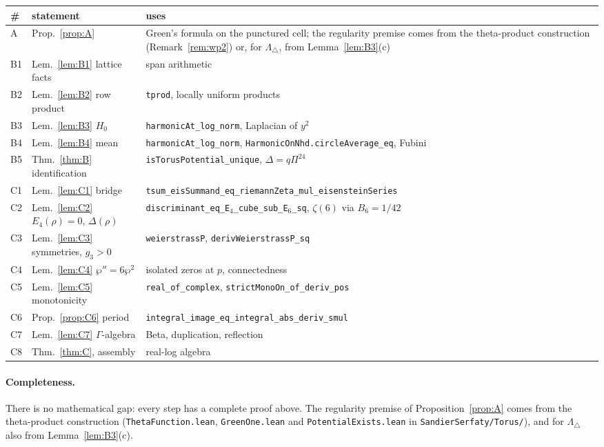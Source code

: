 \documentclass[11pt]{article}
\theoremstyle{definition}
\theoremstyle{remark}
\newcommand{\Ltri}{\Lambda_{\triangle}}
\newcommand{\lean}[1]{\texttt{#1}}
\begin{document}
\begin{center}
\begin{tabular}{@{}lp{4.3cm}p{8.6cm}@{}}
\toprule
\# & statement & uses\\
\midrule
A & Prop.~\ref{prop:A} & Green's formula on the punctured cell; the regularity premise comes from the theta-product
construction (Remark~\ref{rem:wp2}) or, for $\Ltri$, from Lemma~\ref{lem:B3}(c)\\
B1 & Lem.~\ref{lem:B1} lattice facts & span arithmetic\\
B2 & Lem.~\ref{lem:B2} row product & \lean{tprod}, locally uniform products\\
B3 & Lem.~\ref{lem:B3} $H_0$ & \lean{harmonicAt\_log\_norm}, Laplacian of $y^2$\\
B4 & Lem.~\ref{lem:B4} mean & \lean{harmonicAt\_log\_norm}, \lean{HarmonicOnNhd.circleAverage\_eq}, Fubini\\
B5 & Thm.~\ref{thm:B} identification & \lean{isTorusPotential\_unique}, $\Delta=q\Pi^{24}$\\
\midrule
C1 & Lem.~\ref{lem:C1} bridge & \lean{tsum\_eisSummand\_eq\_riemannZeta\_mul\_eisensteinSeries}\\
C2 & Lem.~\ref{lem:C2} $E_4(\rho)=0$, $\Delta(\rho)$ & \lean{discriminant\_eq\_E$_4$\_cube\_sub\_E$_6$\_sq}, $\zeta(6)$ via
$B_6=1/42$\\
C3 & Lem.~\ref{lem:C3} symmetries, $g_3>0$ & \lean{weierstrassP}, \lean{derivWeierstrassP\_sq}\\
C4 & Lem.~\ref{lem:C4} $\wp''=6\wp^2$ & isolated zeros at $p$, connectedness\\
C5 & Lem.~\ref{lem:C5} monotonicity & \lean{real\_of\_complex}, \lean{strictMonoOn\_of\_deriv\_pos}\\
C6 & Prop.~\ref{prop:C6} period & \lean{integral\_image\_eq\_integral\_abs\_deriv\_smul}\\
C7 & Lem.~\ref{lem:C7} $\Gamma$-algebra & Beta, duplication, reflection\\
C8 & Thm.~\ref{thm:C}, assembly & real-log algebra\\
\bottomrule
\end{tabular}
\end{center}

\paragraph{Completeness.} There is no mathematical gap: every step has a complete proof above. The regularity
premise of Proposition~\ref{prop:A} comes from the theta-product construction (\lean{ThetaFunction.lean},
\lean{GreenOne.lean} and \lean{PotentialExists.lean} in \lean{SandierSerfaty/Torus/}), and for $\Ltri$ also from
Lemma~\ref{lem:B3}(c).
\end{document}

